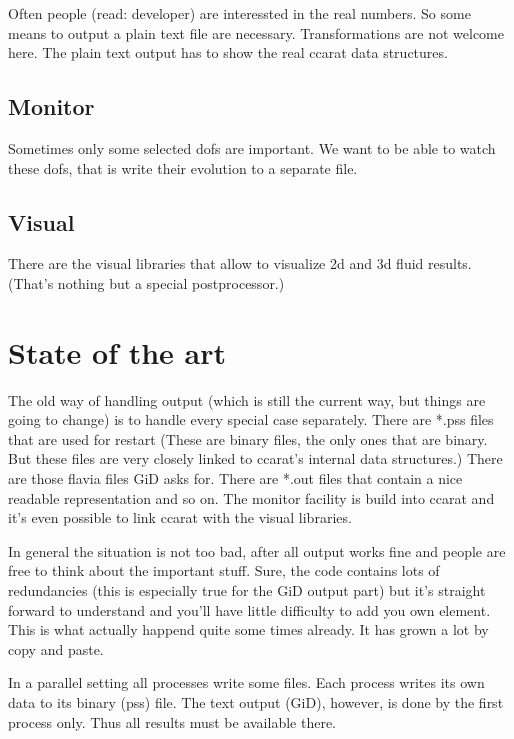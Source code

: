 Often people (read: developer) are interessted in the real numbers.
So some means to output a plain text file are necessary. Transformations
are not welcome here. The plain text output has to show the real ccarat
data structures.


\subsection{Monitor}

Sometimes only some selected dofs are important. We want to be able
to watch these dofs, that is write their evolution to a separate file.


\subsection{Visual}

There are the visual libraries that allow to visualize 2d and 3d fluid
results. (That's nothing but a special postprocessor.)


\section{State of the art}

The old way of handling output (which is still the current way, but
things are going to change) is to handle every special case separately.
There are {*}.pss files that are used for restart (These are binary
files, the only ones that are binary. But these files are very closely
linked to ccarat's internal data structures.) There are those flavia
files GiD asks for. There are {*}.out files that contain a nice readable
representation and so on. The monitor facility is build into ccarat
and it's even possible to link ccarat with the visual libraries.

In general the situation is not too bad, after all output works fine
and people are free to think about the important stuff. Sure, the
code contains lots of redundancies (this is especially true for the
GiD output part) but it's straight forward to understand and you'll
have little difficulty to add you own element. This is what actually
happend quite some times already. It has grown a lot by copy and paste.

In a parallel setting all processes write some files. Each process
writes its own data to its binary (pss) file. The text output (GiD),
however, is done by the first process only. Thus all results must
be available there.


